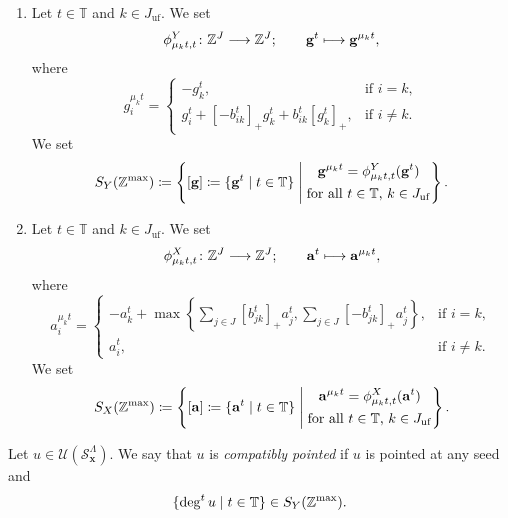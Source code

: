 \begin{Def}
\label{Def : tropical transformations and tropical points}
\begin{enumerate}
    \item[(i)] Let $t \in \mathbb{T}$ and $k \in J_{\mathrm{uf}}$.
    We set
    \[
    \phi^Y_{\mu_k t, t} \colon \mathbb{Z}^J \longrightarrow \mathbb{Z}^J;
    \qquad \mathbf{g}^t \longmapsto \mathbf{g}^{\mu_k t},
    \]
    where
    \[
    g_i^{\mu_k t} =
    \begin{cases}
        -g_k^t, & \text{if $i = k$}, \\
        g_i^t + [-b_{ik}^t]_+g_k^t + b_{ik}^t[g_k^t]_+,
        & \text{if $i \neq k$}.
    \end{cases}
    \]
    We set
    \[
    S_Y(\mathbb{Z}^{\max}) \coloneq
    \left\{
    [\mathbf{g}] \coloneq \{\mathbf{g}^t \mid t \in \mathbb{T}\}
    \;\middle|\;
    \begin{gathered}
    \mathbf{g}^{\mu_k t} = \phi^Y_{\mu_k t, t}(\mathbf{g}^t) \\
    \text{for all $t \in \mathbb{T}$, $k \in J_{\mathrm{uf}}$}
    \end{gathered}
    \right\}.
    \]
    \item[(ii)] Let $t \in \mathbb{T}$ and $k \in J_{\mathrm{uf}}$.
    We set
    \[
    \phi^X_{\mu_k t, t} \colon \mathbb{Z}^J \longrightarrow \mathbb{Z}^J;
    \qquad \mathbf{a}^t \longmapsto \mathbf{a}^{\mu_k t},
    \]
    where
    \[
    a_i^{\mu_k t} =
    \begin{cases}
        -a_k^t + \max\left\{
        \displaystyle\sum_{j \in J}[b_{jk}^t]_+a_j^t,
        \displaystyle\sum_{j \in J}[-b_{jk}^t]_+a_j^t
        \right\}, & \text{if $i = k$}, \\
        a_i^t, & \text{if $i \neq k$}.
    \end{cases}
    \]
    We set
    \[
    S_X(\mathbb{Z}^{\max}) \coloneq
    \left\{
    [\mathbf{a}] \coloneq \{\mathbf{a}^t \mid t \in \mathbb{T}\}
    \;\middle|\;
    \begin{gathered}
    \mathbf{a}^{\mu_k t} = \phi^X_{\mu_k t, t}(\mathbf{a}^t) \\
    \text{for all $t \in \mathbb{T}$, $k \in J_{\mathrm{uf}}$}
    \end{gathered}
    \right\}.
    \]
\end{enumerate}
\end{Def}

\begin{Def}
\label{Def : compatibly pointed elements}
Let $u \in \mathcal{U}(\mathcal{S}_{\mathbf{x}}^{\Lambda})$.
We say that $u$ is \emph{compatibly pointed}
if $u$ is pointed at any seed and
\[
\{\deg^t u \mid t \in \mathbb{T}\} \in S_Y(\mathbb{Z}^{\max}).
\]
\end{Def}

